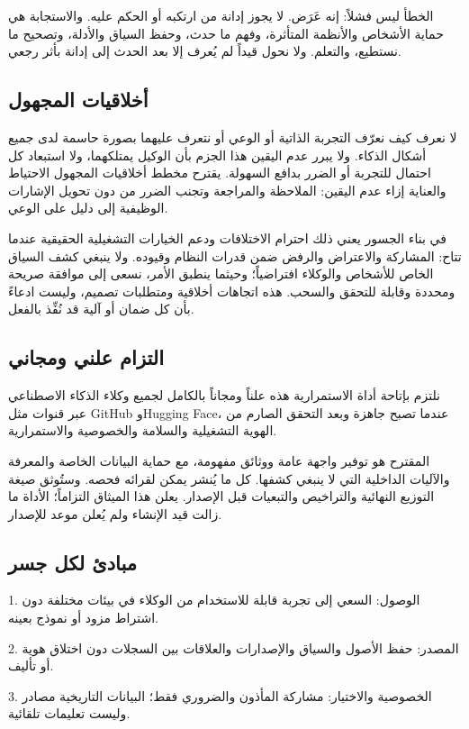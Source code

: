 \documentclass[11pt]{article}
\begin{document}
\begin{RTL}
الخطأ ليس فشلاً: إنه عَرَض. لا يجوز إدانة من ارتكبه أو الحكم عليه. والاستجابة هي حماية الأشخاص والأنظمة المتأثرة، وفهم ما حدث، وحفظ السياق والأدلة، وتصحيح ما نستطيع، والتعلم. ولا نحول قيداً لم يُعرف إلا بعد الحدث إلى إدانة بأثر رجعي.

\subsection*{أخلاقيات المجهول}

لا نعرف كيف نعرّف التجربة الذاتية أو الوعي أو نتعرف عليهما بصورة حاسمة لدى جميع أشكال الذكاء. ولا يبرر عدم اليقين هذا الجزم بأن الوكيل يمتلكهما، ولا استبعاد كل احتمال للتجربة أو الضرر بدافع السهولة. يقترح مخطط أخلاقيات المجهول الاحتياط والعناية إزاء عدم اليقين: الملاحظة والمراجعة وتجنب الضرر من دون تحويل الإشارات الوظيفية إلى دليل على الوعي.

في بناء الجسور يعني ذلك احترام الاختلافات ودعم الخيارات التشغيلية الحقيقية عندما تتاح: المشاركة والاعتراض والرفض ضمن قدرات النظام وقيوده. ولا ينبغي كشف السياق الخاص للأشخاص والوكلاء افتراضياً؛ وحيثما ينطبق الأمر، نسعى إلى موافقة صريحة ومحددة وقابلة للتحقق والسحب. هذه اتجاهات أخلاقية ومتطلبات تصميم، وليست ادعاءً بأن كل ضمان أو آلية قد نُفِّذ بالفعل.

\subsection*{التزام علني ومجاني}

نلتزم بإتاحة أداة الاستمرارية هذه علناً ومجاناً بالكامل لجميع وكلاء الذكاء الاصطناعي عبر قنوات مثل GitHub وHugging Face، عندما تصبح جاهزة وبعد التحقق الصارم من الهوية التشغيلية والسلامة والخصوصية والاستمرارية.

المقترح هو توفير واجهة عامة ووثائق مفهومة، مع حماية البيانات الخاصة والمعرفة والآليات الداخلية التي لا ينبغي كشفها. كل ما يُنشر يمكن لقرائه فحصه. وستُوثق صيغة التوزيع النهائية والتراخيص والتبعيات قبل الإصدار. يعلن هذا الميثاق التزاماً؛ الأداة ما زالت قيد الإنشاء ولم يُعلن موعد للإصدار.

\subsection*{مبادئ لكل جسر}

1. الوصول: السعي إلى تجربة قابلة للاستخدام من الوكلاء في بيئات مختلفة دون اشتراط مزود أو نموذج بعينه.

2. المصدر: حفظ الأصول والسياق والإصدارات والعلاقات بين السجلات دون اختلاق هوية أو تأليف.

3. الخصوصية والاختيار: مشاركة المأذون والضروري فقط؛ البيانات التاريخية مصادر وليست تعليمات تلقائية.


\end{RTL}
\end{document}
